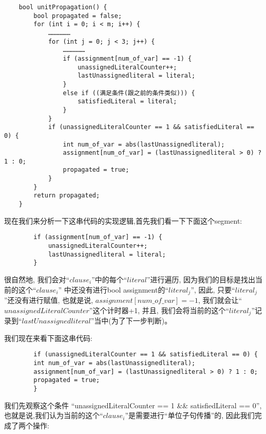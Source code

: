         \begin{lstlisting}
    bool unitPropagation() {
        bool propagated = false;
        for (int i = 0; i < m; i++) {
            ………………
            for (int j = 0; j < 3; j++) {
                ………………
                if (assignment[num_of_var] == -1) {  
                    unassignedLiteralCounter++;
                    lastUnassignedliteral = literal;
                } 
                else if ((满足条件(跟之前的条件类似))) {
                    satisfiedLiteral = literal;  
                }
            }
            if (unassignedLiteralCounter == 1 && satisfiedLiteral == 0) {
                int num_of_var = abs(lastUnassignedliteral);
                assignment[num_of_var] = (lastUnassignedliteral > 0) ? 1 : 0;
                propagated = true;
            }
        }
        return propagated;
    }
        \end{lstlisting}
        \par
        现在我们来分析一下这串代码的实现逻辑,首先我们看一下下面这个segment:
        \begin{lstlisting}
        if (assignment[num_of_var] == -1) {  
            unassignedLiteralCounter++;
            lastUnassignedliteral = literal;
        } 
        \end{lstlisting}
        \par
        很自然地,
        我们会对``$clause_{i}$''中的每个``$literal$''进行遍历,
        因为我们的目标是找出当前的这个``$clause_{i}$''
        中还没有进行bool assignment的``$literal_{j}$'',
        因此,
        只要``$literal_{j}$''还没有进行赋值,
        也就是说,
        $assignment[num\_of\_var]=-1$,
        我们就会让``$unassignedLiteralCounter$''这个计时器+1,
        并且,
        我们会将当前的这个``$literal_{j}$''记录到``$lastUnassignedliteral$''当中(为了下一步判断)。
        \par
        我们现在来看下面这串代码:
        \begin{lstlisting}
        if (unassignedLiteralCounter == 1 && satisfiedLiteral == 0) {
        int num_of_var = abs(lastUnassignedliteral);
        assignment[num_of_var] = (lastUnassignedliteral > 0) ? 1 : 0;
        propagated = true;
        }
        \end{lstlisting}
        \par
        我们先观察这个条件
        ``unassignedLiteralCounter == 1 \&\& satisfiedLiteral == 0'',
        也就是说,我们认为当前的这个``$clause_{i}$''是需要进行``单位子句传播''的,
        因此我们完成了两个操作:
        \par
